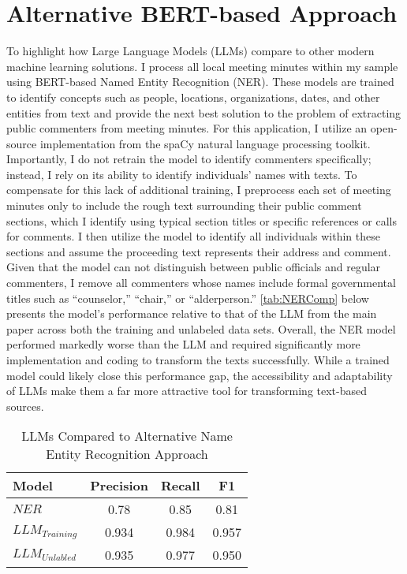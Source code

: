 \section{Alternative BERT-based Approach}
To highlight how Large Language Models (LLMs) compare to other modern machine learning solutions. I process all local meeting minutes within my sample using BERT-based Named Entity Recognition (NER). These models are trained to identify concepts such as people, locations, organizations, dates, and other entities from text and provide the next best solution to the problem of extracting public commenters from meeting minutes. For this application, I utilize an open-source implementation from the spaCy natural language processing toolkit. Importantly, I do not retrain the model to identify commenters specifically; instead, I rely on its ability to identify individuals' names with texts. To compensate for this lack of additional training, I preprocess each set of meeting minutes only to include the rough text surrounding their public comment sections, which I identify using typical section titles or specific references or calls for comments. I then utilize the model to identify all individuals within these sections and assume the proceeding text represents their address and comment. Given that the model can not distinguish between public officials and regular commenters, I remove all commenters whose names include formal governmental titles such as ``counselor,'' ``chair,'' or ``alderperson.'' \autoref{tab:NERComp} below presents the model's performance relative to that of the LLM from the main paper across both the training and unlabeled data sets. Overall, the NER model performed markedly worse than the LLM and required significantly more implementation and coding to transform the texts successfully. While a trained model could likely close this performance gap, the accessibility and adaptability of LLMs make them a far more attractive tool for transforming text-based sources.

\begin{table}[H]
    \centering
    \caption{LLMs Compared to Alternative Name Entity Recognition Approach}
    \label{tab:NERComp}
    \begin{tabular}{l|c|c|c}
    \hline
    Model & Precision & Recall & F1 \\
    \hline
    $NER$ & 0.78 & 0.85 & 0.81 \\
    $LLM_{Training}$ & 0.934 & 0.984 & 0.957 \\
    $LLM_{Unlabled}$ & 0.935 & 0.977 & 0.950 \\
    \hline
    \end{tabular}
    
    \end{table}